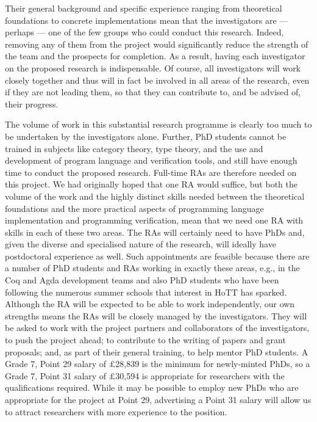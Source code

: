 \documentclass[a4paper,11pt]{article}
\begin{document}
Their general background and specific experience ranging from
theoretical foundations to concrete implementations mean that the
investigators are --- perhaps --- one of the few groups who could conduct
this research. Indeed, removing any of them from the project would
significantly reduce the strength of the team and the prospects for
completion.
As a result, having each
investigator on the proposed research is indispensable. Of course, all
investigators will work closely together and thus will in fact be
involved in all areas of the research, even if they are not leading
them, so that they can contribute to, and be advised of, their
progress.



\vspace{0.02in}

 The volume of work in this substantial
research programme is clearly too much to be undertaken by the
investigators alone. Further, PhD students cannot be trained in
subjects like category theory, type theory, and the use and
development of program language and verification tools, and still have
enough time to conduct the proposed research. Full-time RAs are
therefore needed on this project. We had originally hoped that one RA
would suffice, but both the volume of the work and the highly distinct
skills needed between the theoretical foundations and the more
practical aspects of programming language implementation and
programming verification, mean that we need one RA with skills in each
of these two areas.  The RAs will certainly need to have PhDs and,
given the diverse and specialised nature of the research, will ideally
have postdoctoral experience as well.  Such appointments are feasible
because there are a number of PhD students and RAs working in exactly
these areas, e.g., in the Coq and Agda development teams and also PhD
students who have been following the numerous summer schools that
interest in HoTT has sparked.  Although the RA will be expected to be
able to work independently, our own strengths means the RAs will be
closely managed by the investigators. They will be asked to work with
the project partners and collaborators of the investigators, to push the project ahead; to
contribute to the writing of papers and grant proposals; and, as part
of their general training, to help mentor PhD students. A Grade 7,
Point 29 salary of $\pounds$28,839 is the minimum for newly-minted
PhDs, so a Grade 7, Point 31 salary of $\pounds$30,594 is appropriate
for researchers with the qualifications required. While it may be
possible to employ new PhDs who are appropriate for the project at
Point 29, advertising a Point 31 salary will allow us to attract
researchers with more experience to the position. 
\end{document}
